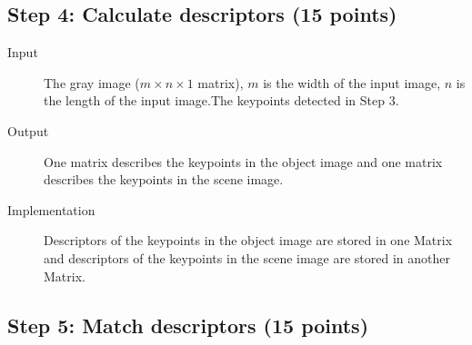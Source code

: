 \documentclass[12pt]{article}
\begin{document}
\subsection{Step 4: Calculate descriptors (15 points)}

\begin{description}
\item[Input] The gray image ($m \times n \times 1$ matrix), $m$ is the width of the input image, $n$ is the length of the input image.The keypoints detected in Step 3.
\item[Output] One matrix describes the keypoints in the object image and one matrix describes the keypoints in the scene image.
\item[Implementation] Descriptors of the keypoints in the object image are stored in one Matrix and descriptors of the keypoints in the scene image are stored in another Matrix.
\end{description}

\subsection{Step 5: Match descriptors (15 points)}
\end{document}
